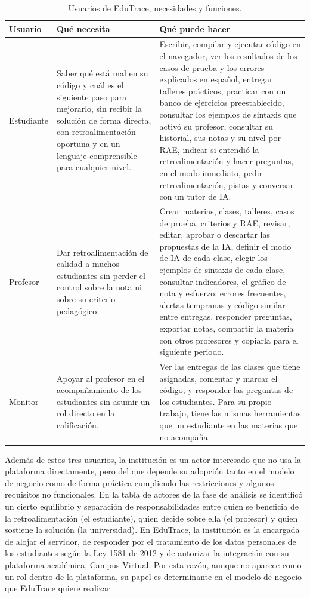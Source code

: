 \documentclass[letterpaper, 10 pt, conference]{ieeeconf}
\begin{document}
\begin{table}[t]
\centering
\small
\caption{Usuarios de EduTrace, necesidades y funciones.}
\label{tab:usuarios}
\begin{tabular}{|p{2cm}|p{5.2cm}|p{9.5cm}|}
\hline
\textbf{Usuario} & \textbf{Qué necesita} & \textbf{Qué puede hacer} \\
\hline
Estudiante &
Saber qué está mal en su código y cuál es el siguiente paso para mejorarlo, sin recibir la solución de forma directa, con retroalimentación oportuna y en un lenguaje comprensible para cualquier nivel. &
Escribir, compilar y ejecutar código en el navegador, ver los resultados de los casos de prueba y los errores explicados en español, entregar talleres prácticos, practicar con un banco de ejercicios preestablecido, consultar los ejemplos de sintaxis que activó su profesor, consultar su historial, sus notas y su nivel por RAE, indicar si entendió la retroalimentación y hacer preguntas, en el modo inmediato, pedir retroalimentación, pistas y conversar con un tutor de IA. \\
\hline
Profesor &
Dar retroalimentación de calidad a muchos estudiantes sin perder el control sobre la nota ni sobre su criterio pedagógico. &
Crear materias, clases, talleres, casos de prueba, criterios y RAE, revisar, editar, aprobar o descartar las propuestas de la IA, definir el modo de IA de cada clase, elegir los ejemplos de sintaxis de cada clase, consultar indicadores, el gráfico de nota y esfuerzo, errores frecuentes, alertas tempranas y código similar entre entregas, responder preguntas, exportar notas, compartir la materia con otros profesores y copiarla para el siguiente periodo. \\
\hline
Monitor &
Apoyar al profesor en el acompañamiento de los estudiantes sin asumir un rol directo en la calificación. &
Ver las entregas de las clases que tiene asignadas, comentar y marcar el código, y responder las preguntas de los estudiantes. Para su propio trabajo, tiene las mismas herramientas que un estudiante en las materias que no acompaña. \\
\hline
\end{tabular}
\end{table}
Además de estos tres usuarios, la institución es un actor interesado que no usa la plataforma directamente, pero del que depende su adopción tanto en el modelo de negocio como de forma práctica cumpliendo las restricciones y algunos requisitos no funcionales.
En la tabla de actores de la fase de análisis se identificó un cierto equilibrio y separación de responsabilidades entre quien se beneficia de la retroalimentación (el estudiante), quien decide sobre ella (el profesor) y quien sostiene la solución (la universidad).
En EduTrace, la institución es la encargada de alojar el servidor, de responder por el tratamiento de los datos personales de los estudiantes según la Ley 1581 de 2012 \cite{3} y de autorizar la integración con su plataforma académica, Campus Virtual.
Por esta razón, aunque no aparece como un rol dentro de la plataforma, su papel es determinante en el modelo de negocio que EduTrace quiere realizar.
\end{document}
